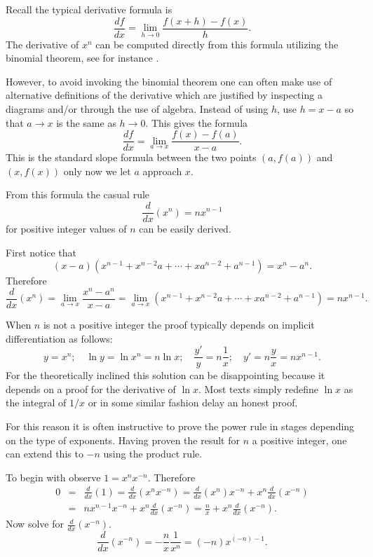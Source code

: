 \documentclass[12pt]{article}
\begin{document}
Recall the typical derivative formula is
\[ \frac{df}{dx}=\lim_{h\rightarrow 0}\frac{f(x+h)-f(x)}{h}.\]
The derivative of $x^n$ can be computed directly from this formula utilizing the binomial theorem, see for instance .  

However, to avoid invoking the binomial theorem one can often make use of alternative definitions of the derivative which are justified by inspecting a diagrams and/or through the use of algebra.  Instead of using $h$, use $h=x-a$ so that $a\rightarrow x$ is the same  as $h\rightarrow 0$.  This gives the formula
\[ \frac{df}{dx}=\lim_{a\rightarrow x}\frac{f(x)-f(a)}{x-a}.\]
This is the standard slope formula between the two points $(a,f(a))$ and $(x,f(x))$ only now we let $a$ approach $x$.

From this formula the casual rule 
\[\frac{d}{dx}(x^n)=nx^{n-1}\]
for positive integer values of $n$ can be easily derived.

First notice that 
\[(x-a)(x^{n-1}+x^{n-2}a+\cdots + x a^{n-2}+ a^{n-1})=x^n - a^n.\]
Therefore
\begin{equation*}
\frac{d}{dx}(x^n)=\lim_{a\rightarrow x} \frac{x^n-a^n}{x-a}
=\lim_{a\rightarrow x} (x^{n-1}+x^{n-2}a+\cdots + xa^{n-2}+ a^{n-1})
=nx^{n-1}.
\end{equation*}

When $n$ is not a positive integer the proof typically depends on implicit differentiation as follows:
\[y=x^n;\quad \ln y=\ln x^n=n\ln x;\quad \frac{y'}{y}=n\frac{1}{x};\quad
   y'=n\frac{y}{x}=nx^{n-1}.\]
For the theoretically inclined this solution can be disappointing because it depends on a proof for the derivative of $\ln x$.  Most texts simply redefine $\ln x$ as the integral of $1/x$ or in some similar fashion delay an honest proof.  

For this reason it is often instructive to prove the power rule in stages depending on the type of exponents.  Having proven the result for $n$ a positive integer, one can extend this to $-n$ using the product rule.

To begin with observe $1=x^n x^{-n}$.  Therefore
\begin{eqnarray*}
0 & = & \frac{d}{dx}(1)=\frac{d}{dx}(x^n x^{-n})=\frac{d}{dx}(x^n) x^{-n}+x^n \frac{d}{dx}(x^{-n})\\
& = &
nx^{n-1} x^{-n}+x^n\frac{d}{dx}(x^{-n})=\frac{n}{x}+x^n\frac{d}{dx}(x^{-n}).
\end{eqnarray*}
Now solve for $\frac{d}{dx}(x^{-n})$.
\[\frac{d}{dx}(x^{-n})=-\frac{n}{x}\frac{1}{x^n}=(-n)x^{(-n)-1}.\]
\end{document}
